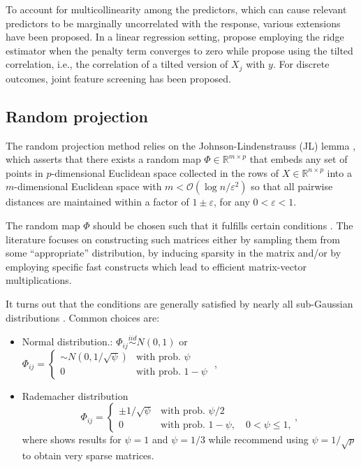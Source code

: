 \documentclass[
  article]{jss}
\begin{document}
To account for multicollinearity among the predictors, which can cause
relevant predictors to be marginally uncorrelated with the response,
various extensions have been proposed. In a linear regression setting,
\citet{Wang2015HOLP} propose employing the ridge estimator when the
penalty term converges to zero while \citet{cho2012high} propose using
the tilted correlation, i.e., the correlation of a tilted version of
\(X_j\) with \(y\). For discrete outcomes, joint feature screening
\citet{SMLE2014} has been proposed.

\subsection{Random projection}\label{random-projection}

The random projection method relies on the Johnson-Lindenstrauss (JL)
lemma \citep{JohnsonLindenstrauss1984}, which asserts that there exists
a random map \(\Phi\in \mathbb{R}^{m \times p}\) that embeds any set of
points in \(p\)-dimensional Euclidean space collected in the rows of
\(X\in \mathbb{R}^{n\times p}\) into a \(m\)-dimensional Euclidean space
with \(m< \mathcal{O}(\log n/\varepsilon^2)\) so that all pairwise
distances are maintained within a factor of \(1 \pm \varepsilon\), for
any \(0 <\varepsilon< 1\).

The random map \(\Phi\) should be chosen such that it fulfills certain
conditions \citep[see][]{JohnsonLindenstrauss1984}. The literature
focuses on constructing such matrices either by sampling them from some
``appropriate'' distribution, by inducing sparsity in the matrix and/or
by employing specific fast constructs which lead to efficient
matrix-vector multiplications.

It turns out that the conditions are generally satisfied by nearly all
sub-Gaussian distributions \citep{matouvsek2008variants}. Common choices
are:

\begin{itemize}
\item
  Normal distribution.: \(\Phi_{ij} \overset{iid}{\sim} N(0,1)\)
  \citep{FRANKL1988JLSphere} or
  \(\Phi_{ij} = \begin{cases} {\sim} N(0,1/\sqrt{\psi}) & \text{with prob. } \psi \\ 0 & \text{with prob. } 1 - \psi \end{cases}\)
  \citep{matouvsek2008variants},
\item
  Rademacher distribution
  \citep{ACHLIOPTAS2003JL, LiHastie2006VerySparseRP} \[
  \Phi_{ij} = \begin{cases}
      \pm 1/\sqrt{\psi} & \text{with prob. } \psi/2 \\
      0 & \text{with prob. } 1 - \psi, \quad 0<\psi\leq 1‚
    \end{cases},
  \] where \citet{ACHLIOPTAS2003JL} shows results for \(\psi=1\) and
  \(\psi=1/3\) while \citet{LiHastie2006VerySparseRP} recommend using
  \(\psi=1/\sqrt{p}\) to obtain very sparse matrices.
\end{itemize}
\end{document}
